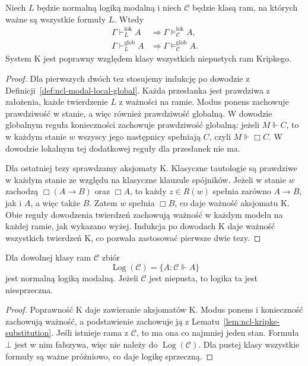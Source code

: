 \begin{twierdzenie}
\label{thm:ncl-kripke-soundness}
Niech $L$ będzie normalną logiką modalną
i niech $\mathcal C$ będzie klasą ram,
na których ważne są wszystkie formuły $L$.
Wtedy
\[
\begin{aligned}
 \Gamma\vdash_L^{\mathrm{lok}} A
 &\Longrightarrow
 \Gamma\models_{\mathcal C}^{\mathrm{lok}}A,\\
 \Gamma\vdash_L^{\mathrm{glob}} A
 &\Longrightarrow
 \Gamma\models_{\mathcal C}^{\mathrm{glob}}A.
\end{aligned}
\]
System K jest poprawny względem klasy
wszystkich niepustych ram Kripkego.
\end{twierdzenie}
\begin{proof}
Dla pierwszych dwóch tez stosujemy indukcję
po dowodzie z
Definicji~\ref{def:ncl-modal-local-global}.
Każda przesłanka jest prawdziwa z założenia,
każde twierdzenie $L$ z ważności na ramie.
Modus ponens zachowuje prawdziwość w stanie,
a więc również prawdziwość globalną.
W dowodzie globalnym reguła konieczności
zachowuje prawdziwość globalną: jeżeli
$M\Vdash C$, to w każdym stanie $w$
wszyscy jego następnicy spełniają $C$,
czyli $M\Vdash\Box C$.
W dowodzie lokalnym tej dodatkowej
reguły dla przesłanek nie ma.

Dla ostatniej tezy sprawdzamy aksjomaty K.
Klasyczne tautologie są prawdziwe w każdym
stanie ze względu na klasyczne klauzule
spójników. Jeżeli w stanie $w$ zachodzą
$\Box(A\to B)$ oraz $\Box A$, to każdy
$z\in R(w)$ spełnia zarówno $A\to B$, jak i $A$,
a więc także $B$. Zatem $w$ spełnia $\Box B$,
co daje ważność aksjomatu K.
Obie reguły dowodzenia twierdzeń zachowują
ważność w każdym modelu na każdej ramie,
jak wykazano wyżej. Indukcja po dowodach
K daje ważność wszystkich twierdzeń K,
co pozwala zastosować pierwsze dwie tezy.
\end{proof}

\begin{wniosek}
\label{cor:ncl-kripke-frame-logic}
Dla dowolnej klasy ram $\mathcal C$ zbiór
\[
 \operatorname{Log}(\mathcal C)
 =\{A:\mathcal C\Vdash A\}
\]
jest normalną logiką modalną.
Jeżeli $\mathcal C$ jest niepusta,
to logika ta jest niesprzeczna.
\end{wniosek}
\begin{proof}
Poprawność K daje zawieranie aksjomatów K.
Modus ponens i konieczność zachowują
ważność, a podstawienie zachowuje ją
z Lematu~\ref{lem:ncl-kripke-substitution}.
Jeśli istnieje rama z $\mathcal C$,
to ma ona co najmniej jeden stan.
Formuła $\bot$ jest w nim fałszywa,
więc nie należy do $\operatorname{Log}(\mathcal C)$.
Dla pustej klasy wszystkie formuły są
ważne próżniowo, co daje logikę sprzeczną.
\end{proof}


